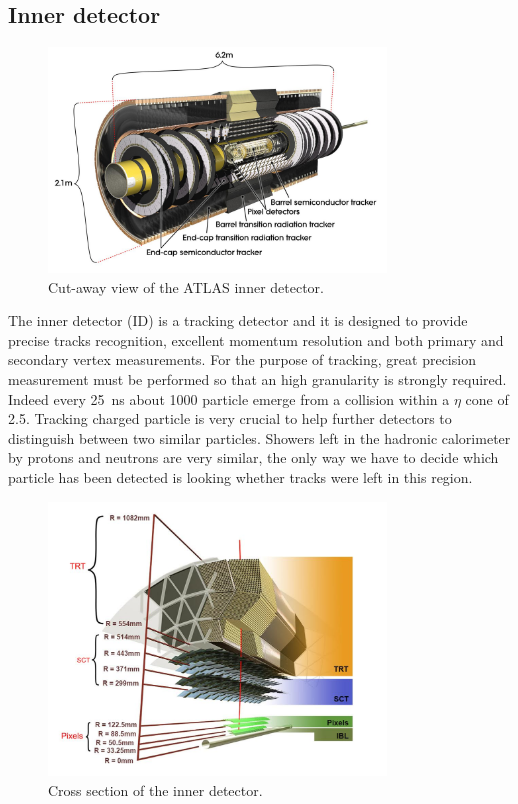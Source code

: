 \subsection{Inner detector}
\label{sec:ID}
\begin{figure}[tp]
\centering
\includegraphics[width=0.8\textwidth]{LHC_ATLAS/ID}
\caption{Cut-away view of the ATLAS inner detector.}
\end{figure}

The inner detector (ID) is a tracking detector and it is designed to provide precise tracks recognition, excellent momentum resolution and both primary and secondary vertex measurements. For the purpose of tracking, great precision measurement must be performed so that an high granularity is strongly required. Indeed every \SI{25}{ns} about \num{1000} particle emerge from a collision within a $\eta$ cone of \num{2.5}. Tracking charged particle is very crucial to help further detectors to distinguish between two similar particles. Showers left in the hadronic calorimeter by protons and neutrons are very similar, the only way we have to decide which particle has been detected is looking whether tracks were left in this region.

\begin{figure}[pt]
\centering
\includegraphics[width=0.8\textwidth]{LHC_ATLAS/IDCrossSection}
\caption{Cross section of the inner detector.}
\end{figure}

